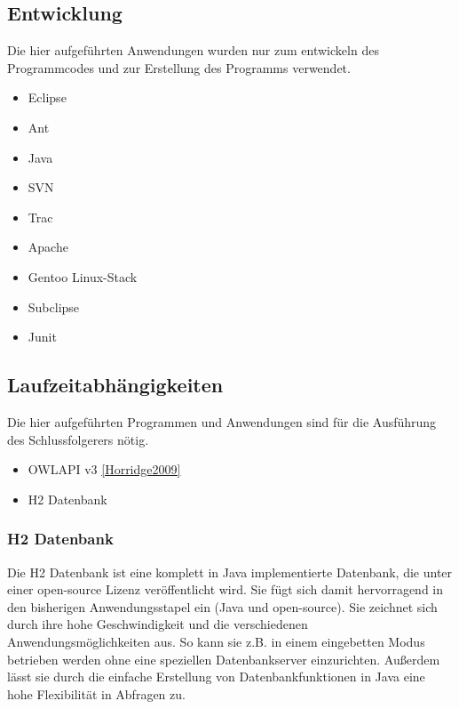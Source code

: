 \subsection{Entwicklung}

Die hier aufgeführten Anwendungen wurden nur zum entwickeln des Programmcodes und zur Erstellung des Programms verwendet.
\begin{itemize}
  \item Eclipse
  \item Ant
  \item Java
  \item SVN
  \item Trac
  \item Apache
  \item Gentoo Linux-Stack
  \item Subclipse
  \item Junit
\end{itemize}

\subsection{Laufzeitabhängigkeiten}
Die hier aufgeführten Programmen und Anwendungen sind für die Ausführung des Schlussfolgerers nötig.
\begin{itemize}
  \item OWLAPI v3 \ref{Horridge2009}
  \item H2 Datenbank
\end{itemize}
 
\subsubsection{H2 Datenbank}
Die H2 Datenbank ist eine komplett in Java implementierte Datenbank, die unter einer open-source Lizenz veröffentlicht wird. Sie fügt sich damit hervorragend in den bisherigen Anwendungsstapel ein (Java und open-source). Sie zeichnet sich durch ihre hohe Geschwindigkeit und die verschiedenen Anwendungsmöglichkeiten aus. So kann sie z.B. in einem eingebetten Modus betrieben werden ohne eine speziellen Datenbankserver einzurichten. Außerdem lässt sie durch die einfache Erstellung von Datenbankfunktionen in Java eine hohe Flexibilität in Abfragen zu.
